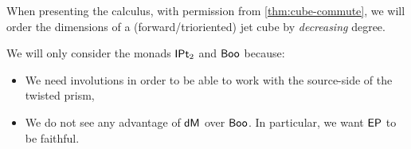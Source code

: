 \documentclass[a4paper]{article}
\begin{document}
\begin{convention} \label{conv:sort-cubes}
	When presenting the calculus, with permission from \cref{thm:cube-commute}, we will order the dimensions of a (forward/trioriented) jet cube by \emph{decreasing} degree.
\end{convention}
\begin{remark}
	We will only consider the monads ${\mathsf{IPt}_2}$ and $\mathsf{Boo}$ because:
	\begin{itemize}
		\item We need involutions in order to be able to work with the source-side of the twisted prism,
		\item We do not see any advantage of $\mathsf{dM}$ over $\mathsf{Boo}$. In particular, we want $\mathsf{EP}$ to be faithful.
	\end{itemize}
\end{remark}
\end{document}
